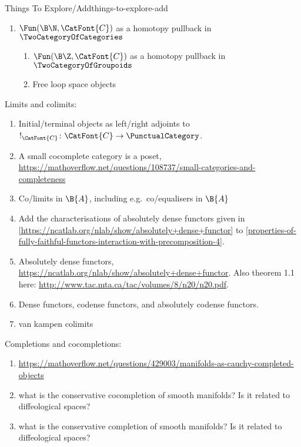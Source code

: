 \begin{remark}{Things To Explore/Add}{things-to-explore-add}
\begin{enumerate}
\begin{enumerate}
                \item The quotient of $\Fun(\B\N,\CatFont{C})$ by the $\N$-action should act as a kind of cyclic directed loop space of $\CatFont{C}$
            \end{enumerate}
        \item $\Fun(\B\N,\CatFont{C})$ as a homotopy pullback in $\TwoCategoryOfCategories$
            \begin{enumerate}
                \item $\Fun(\B\Z,\CatFont{C})$ as a homotopy pullback in $\TwoCategoryOfGroupoids$
                \item Free loop space objects
            \end{enumerate}
    \end{enumerate}
    Limits and colimits:
    \begin{enumerate}
        \item Initial/terminal objects as left/right adjoints to $!_{\CatFont{C}}\colon\CatFont{C}\to\PunctualCategory$.
        \item A small cocomplete category is a poset, \url{https://mathoverflow.net/questions/108737/small-categories-and-completeness}
        \item Co/limits in $\B{A}$, including e.g.\ co/equalisers in $\B{A}$
        \item Add the characterisations of absolutely dense functors given in \cref{https://ncatlab.org/nlab/show/absolutely+dense+functor} to \cref{properties-of-fully-faithful-functors-interaction-with-precomposition-4}.
        \item Absolutely dense functors, \url{https://ncatlab.org/nlab/show/absolutely+dense+functor}. Also theorem 1.1 here: \url{http://www.tac.mta.ca/tac/volumes/8/n20/n20.pdf}.
        \item Dense functors, codense functors, and absolutely codense functors.
        \item van kampen colimits
    \end{enumerate}
    Completions and cocompletions:
    \begin{enumerate}
        \item \url{https://mathoverflow.net/questions/429003/manifolds-as-cauchy-completed-objects}
        \item what is the conservative cocompletion of smooth manifolds? Is it related to diffeological spaces?
        \item what is the conservative completion of smooth manifolds? Is it related to diffeological spaces?

\end{enumerate}
\end{remark}
